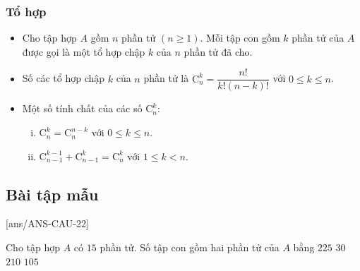 \begin{khung}
\subsubsection{Tổ hợp}
\begin{itemize}
	\item Cho tập hợp $A$ gồm $n$ phần tử $(n\geq 1)$. Mỗi tập con gồm $k$ phần tử của $A$ được gọi là một tổ hợp chập $k$ của $n$ phần tử đã cho.
	\item Số các tổ hợp chập $k$ của $n$ phần tử là $\mathrm{C}^k_n=\dfrac{n!}{k!(n-k)!}$ với $0\leq k\leq n$.
	\item Một số tính chất của các số $\mathrm{C}^k_n$:
	\begin{enumerate}[i)]
		\item $\mathrm{C}^k_n=\mathrm{C}^{n-k}_n$ với $0\leq k\leq n$.
		\item $\mathrm{C}^{k-1}_{n-1}+\mathrm{C}^k_{n-1}=\mathrm{C}^k_n$ với $1\leq k< n$.
		\end{enumerate}
\end{itemize}
\end{khung}
\subsection{Bài tập mẫu}
[ans/ANS-CAU-22]
\begin{khung}
	\begin{vd}%
		Cho tập hợp $A$ có $15$ phần tử. Số tập con gồm hai phần tử của $A$ bằng
		\choice
		{$225$}	
		{$30$}
		{$210$}
		{\True $105$}
	\end{vd}
\end{khung}
